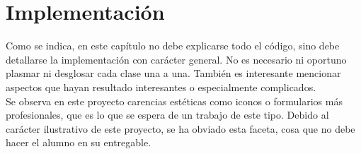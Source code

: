\chapter{Implementación}
\label{sec:implementation}

\introImplementation %

\begin{shaded}
Como se indica, en este capítulo no debe explicarse todo el código, sino debe detallarse la implementación con carácter general. No es necesario ni oportuno plasmar ni desglosar cada clase una a una. También es interesante mencionar aspectos que hayan resultado interesantes o especialmente complicados.\\

Se observa en este proyecto carencias estéticas como iconos o formularios más profesionales, que es lo que se espera de un trabajo de este tipo. Debido al carácter ilustrativo de este proyecto, se ha obviado esta faceta, cosa que no debe hacer el alumno en su entregable.
\end{shaded}




